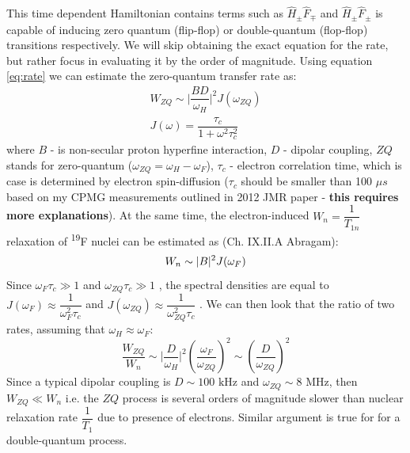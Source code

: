 \documentclass[a4paper, 12pt]{article}
\begin{document}
This time dependent Hamiltonian contains terms such as $\hat{H}_{\pm} \hat{F}_{\mp}$ and $\hat{H}_{\pm} \hat{F}_{\pm}$ is capable of inducing zero quantum (flip-flop) or double-quantum (flop-flop) transitions respectively. We will skip obtaining the exact equation for the rate, but rather focus in evaluating it by the order of magnitude. Using equation \ref{eq:rate} we can estimate the zero-quantum transfer rate as:
\begin{equation}
\begin{array}{cc}
W_{ZQ}  \sim \vert \dfrac{B D}{\omega_H} \vert ^2 J(\omega_{ZQ}) \\
J(\omega) = \dfrac{\tau_c}{1+\omega^2\tau_c^2}
\end{array}
\end{equation}
where $B$ - is non-secular proton hyperfine interaction, $D$ - dipolar coupling, $ZQ$ stands for zero-quantum ($\omega_{ZQ} = \omega_H - \omega_F$), $\tau_c$ - electron correlation time, which is case is determined by electron spin-diffusion ($\tau_c$ should be smaller than 100 $\mu s$ based on my CPMG measurements outlined in 2012 JMR paper - \textbf{this requires more explanations}). At the same time, the electron-induced $W_n = \dfrac{1}{T_{1n}}$ relaxation of \textsuperscript{19}F nuclei can be estimated as (Ch. IX.II.A Abragam):
\begin{equation}
W_{n}  \sim \vert B \vert ^2 J(\omega_F) \\
\end{equation}
Since $\omega_F \tau_c \gg 1$ and $\omega_{ZQ} \tau_c \gg 1$ ,  the spectral densities are equal to $J(\omega_F) \approx \dfrac{1}{\omega_F^2 \tau_c}$ and $J(\omega_{ZQ}) \approx \dfrac{1}{\omega_{ZQ}^2 \tau_c}$ . We can then look that the ratio of two rates, assuming that $\omega_H \approx \omega_F$:
\begin{equation}
\dfrac{W_{ZQ}}{W_n} \sim \vert \dfrac{D}{\omega_H} \vert^2 (\dfrac{\omega_F}{\omega_{ZQ}})^2 \sim (\dfrac{D}{\omega_{ZQ}})^2
\end{equation}
Since a typical dipolar coupling is $D \sim 100 \text{ kHz}$ and $\omega_{ZQ} \sim 8 \text{ MHz}$, then $W_{ZQ} \ll W_n$ i.e. the $ZQ$ process is several orders of magnitude slower than nuclear relaxation rate $\dfrac{1}{T_1}$ due to presence of electrons. Similar argument is true for for a double-quantum process. 
\end{document}
